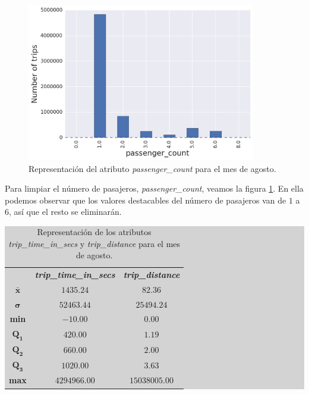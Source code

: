 \begin{figure}[ht]
  \centering
  \includegraphics[width=100mm]{figures/ch_05/passenger_count.png}
  \caption{Representación del atributo \emph{passenger\_count} para el mes de agosto.}
  \label{fig:5.8}
\end{figure}

Para limpiar el número de pasajeros, \emph{passenger\_count}, veamos la figura \ref{fig:5.8}. En ella podemos observar que los valores destacables del número de pasajeros van de $1$ a $6$, así que el resto se eliminarán.

\begin{table}[H]
\centering
\colorbox{lightgray}{\begin{tabular}{*{3}{c}}
  & \emph{\textbf{trip\_time\_in\_secs}} & \emph{\textbf{trip\_distance}} \\
  $\mathbf{\bar{x}}$ & $1435.24$ & $82.36$ \\
  $\mathbf{\sigma}$ & $52463.44$ & $25494.24$ \\
  \textbf{min} & $-10.00$ & $0.00$ \\
  $\mathbf{Q_{1}}$ & $420.00$ & $1.19$ \\
  $\mathbf{Q_{2}}$ & $660.00$ & $2.00$ \\
  $\mathbf{Q_{3}}$ & $1020.00$ & $3.63$ \\
  \textbf{max} & $4294966.00$ & $15038005.00$
\end{tabular}}
\caption{Representación de los atributos \emph{trip\_time\_in\_secs} y \emph{trip\_distance} para el mes de agosto.}
\label{table:5.2}
\end{table}

